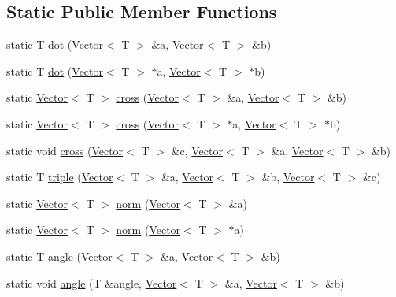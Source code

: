 \subsection*{Static Public Member Functions}
\begin{DoxyCompactItemize}
\item 
static T \hyperlink{classccmc_1_1_vector_a9f03423f6c4bc0ccecc1fff2f7ca79a2}{dot} (\hyperlink{classccmc_1_1_vector}{Vector}$<$ T $>$ \&a, \hyperlink{classccmc_1_1_vector}{Vector}$<$ T $>$ \&b)
\item 
static T \hyperlink{classccmc_1_1_vector_a6071878bac8259f1794aa9109ae9431b}{dot} (\hyperlink{classccmc_1_1_vector}{Vector}$<$ T $>$ $\ast$a, \hyperlink{classccmc_1_1_vector}{Vector}$<$ T $>$ $\ast$b)
\item 
static \hyperlink{classccmc_1_1_vector}{Vector}$<$ T $>$ \hyperlink{classccmc_1_1_vector_a554c29dfc55fb81cd10ce6b0ea657dbf}{cross} (\hyperlink{classccmc_1_1_vector}{Vector}$<$ T $>$ \&a, \hyperlink{classccmc_1_1_vector}{Vector}$<$ T $>$ \&b)
\item 
static \hyperlink{classccmc_1_1_vector}{Vector}$<$ T $>$ \hyperlink{classccmc_1_1_vector_a6fe725fff4788809995acb4f76cc40b8}{cross} (\hyperlink{classccmc_1_1_vector}{Vector}$<$ T $>$ $\ast$a, \hyperlink{classccmc_1_1_vector}{Vector}$<$ T $>$ $\ast$b)
\item 
static void \hyperlink{classccmc_1_1_vector_a89486dfb64a4c179b2d889d1a1289adf}{cross} (\hyperlink{classccmc_1_1_vector}{Vector}$<$ T $>$ \&c, \hyperlink{classccmc_1_1_vector}{Vector}$<$ T $>$ \&a, \hyperlink{classccmc_1_1_vector}{Vector}$<$ T $>$ \&b)
\item 
static T \hyperlink{classccmc_1_1_vector_ab6c35b31d15e8619a0b81ac55966065e}{triple} (\hyperlink{classccmc_1_1_vector}{Vector}$<$ T $>$ \&a, \hyperlink{classccmc_1_1_vector}{Vector}$<$ T $>$ \&b, \hyperlink{classccmc_1_1_vector}{Vector}$<$ T $>$ \&c)
\item 
static \hyperlink{classccmc_1_1_vector}{Vector}$<$ T $>$ \hyperlink{classccmc_1_1_vector_a247adba279968167b897541ce67b656f}{norm} (\hyperlink{classccmc_1_1_vector}{Vector}$<$ T $>$ \&a)
\item 
static \hyperlink{classccmc_1_1_vector}{Vector}$<$ T $>$ \hyperlink{classccmc_1_1_vector_a48b52a0776852fd9fd55d197304da1f8}{norm} (\hyperlink{classccmc_1_1_vector}{Vector}$<$ T $>$ $\ast$a)
\item 
static T \hyperlink{classccmc_1_1_vector_a1ea3da7704529abf9d706c578d771b8b}{angle} (\hyperlink{classccmc_1_1_vector}{Vector}$<$ T $>$ \&a, \hyperlink{classccmc_1_1_vector}{Vector}$<$ T $>$ \&b)
\item 
static void \hyperlink{classccmc_1_1_vector_a3f25371b0e6a858385069f414778e235}{angle} (T \&angle, \hyperlink{classccmc_1_1_vector}{Vector}$<$ T $>$ \&a, \hyperlink{classccmc_1_1_vector}{Vector}$<$ T $>$ \&b)
\end{DoxyCompactItemize}
